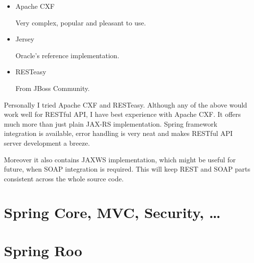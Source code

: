 	\begin{itemize}
	  \item Apache CXF
	  
	  Very complex, popular and pleasant to use.
	  \item Jersey
	  
	  Oracle's reference implementation.
	  \item RESTeasy
	  
	  From JBoss Community.
	\end{itemize}
	
	Personally I tried Apache CXF and RESTeasy. Although any of the above would work well for RESTful API, I have best
	experience with Apache CXF. It offers much more than just plain JAX-RS implementation. Spring framework integration is
	available, error handling is very neat and makes RESTful API server development a breeze.
	
	Moreover it also contains \gls{JAXWS} implementation, which might be useful for future, when SOAP integration is
	required. This will keep REST and SOAP parts consistent across the whole source code.
	
	\section{Spring Core, MVC, Security, \ldots}
	
	\section{Spring Roo}